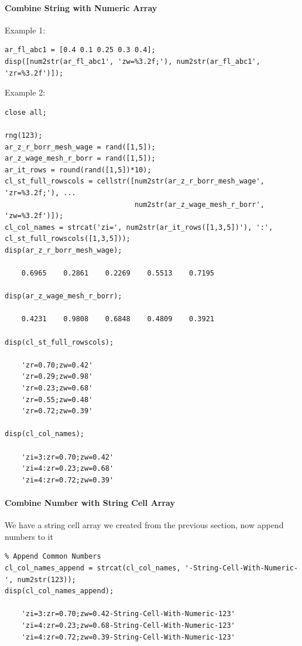 \documentclass[
]{book}
\begin{document}
\hypertarget{combine-string-with-numeric-array}{%
\paragraph{Combine String with Numeric Array}\label{combine-string-with-numeric-array}}

Example 1:

\begin{verbatim}
ar_fl_abc1 = [0.4 0.1 0.25 0.3 0.4];
disp([num2str(ar_fl_abc1', 'zw=%3.2f;'), num2str(ar_fl_abc1', 'zr=%3.2f')]);
\end{verbatim}

Example 2:

\begin{verbatim}
close all;

rng(123);
ar_z_r_borr_mesh_wage = rand([1,5]);
ar_z_wage_mesh_r_borr = rand([1,5]);
ar_it_rows = round(rand([1,5])*10);
cl_st_full_rowscols = cellstr([num2str(ar_z_r_borr_mesh_wage', 'zr=%3.2f;'), ...
                               num2str(ar_z_wage_mesh_r_borr', 'zw=%3.2f')]);
cl_col_names = strcat('zi=', num2str(ar_it_rows([1,3,5])'), ':', cl_st_full_rowscols([1,3,5]));
disp(ar_z_r_borr_mesh_wage);

    0.6965    0.2861    0.2269    0.5513    0.7195

disp(ar_z_wage_mesh_r_borr);

    0.4231    0.9808    0.6848    0.4809    0.3921

disp(cl_st_full_rowscols);

    'zr=0.70;zw=0.42'
    'zr=0.29;zw=0.98'
    'zr=0.23;zw=0.68'
    'zr=0.55;zw=0.48'
    'zr=0.72;zw=0.39'

disp(cl_col_names);

    'zi=3:zr=0.70;zw=0.42'
    'zi=4:zr=0.23;zw=0.68'
    'zi=4:zr=0.72;zw=0.39'
\end{verbatim}

\hypertarget{combine-number-with-string-cell-array}{%
\paragraph{Combine Number with String Cell Array}\label{combine-number-with-string-cell-array}}

We have a string cell array we created from the previous section, now
append numbers to it

\begin{verbatim}
% Append Common Numbers
cl_col_names_append = strcat(cl_col_names, '-String-Cell-With-Numeric-', num2str(123));
disp(cl_col_names_append);

    'zi=3:zr=0.70;zw=0.42-String-Cell-With-Numeric-123'
    'zi=4:zr=0.23;zw=0.68-String-Cell-With-Numeric-123'
    'zi=4:zr=0.72;zw=0.39-String-Cell-With-Numeric-123'
\end{verbatim}
\end{document}
